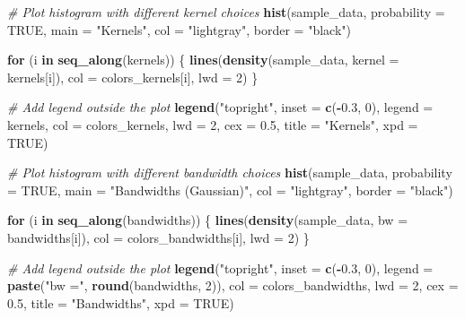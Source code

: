 \documentclass[
]{article}
\newenvironment{Shaded}{\begin{snugshade}}{\end{snugshade}}
\newcommand{\AttributeTok}[1]{\textcolor[rgb]{0.13,0.29,0.53}{#1}}
\newcommand{\CommentTok}[1]{\textcolor[rgb]{0.56,0.35,0.01}{\textit{#1}}}
\newcommand{\ConstantTok}[1]{\textcolor[rgb]{0.56,0.35,0.01}{#1}}
\newcommand{\ControlFlowTok}[1]{\textcolor[rgb]{0.13,0.29,0.53}{\textbf{#1}}}
\newcommand{\DecValTok}[1]{\textcolor[rgb]{0.00,0.00,0.81}{#1}}
\newcommand{\FloatTok}[1]{\textcolor[rgb]{0.00,0.00,0.81}{#1}}
\newcommand{\FunctionTok}[1]{\textcolor[rgb]{0.13,0.29,0.53}{\textbf{#1}}}
\newcommand{\NormalTok}[1]{#1}
\newcommand{\SpecialCharTok}[1]{\textcolor[rgb]{0.81,0.36,0.00}{\textbf{#1}}}
\newcommand{\StringTok}[1]{\textcolor[rgb]{0.31,0.60,0.02}{#1}}
\begin{document}
\begin{Shaded}
\begin{Highlighting}[]
\CommentTok{\# Plot histogram with different kernel choices}
\FunctionTok{hist}\NormalTok{(sample\_data, }\AttributeTok{probability =} \ConstantTok{TRUE}\NormalTok{, }\AttributeTok{main =} \StringTok{"Kernels"}\NormalTok{, }\AttributeTok{col =} \StringTok{"lightgray"}\NormalTok{, }\AttributeTok{border =} \StringTok{"black"}\NormalTok{)}

\ControlFlowTok{for}\NormalTok{ (i }\ControlFlowTok{in} \FunctionTok{seq\_along}\NormalTok{(kernels)) \{}
  \FunctionTok{lines}\NormalTok{(}\FunctionTok{density}\NormalTok{(sample\_data, }\AttributeTok{kernel =}\NormalTok{ kernels[i]), }\AttributeTok{col =}\NormalTok{ colors\_kernels[i], }\AttributeTok{lwd =} \DecValTok{2}\NormalTok{)}
\NormalTok{\}}

\CommentTok{\# Add legend outside the plot}
\FunctionTok{legend}\NormalTok{(}\StringTok{"topright"}\NormalTok{, }\AttributeTok{inset =} \FunctionTok{c}\NormalTok{(}\SpecialCharTok{{-}}\FloatTok{0.3}\NormalTok{, }\DecValTok{0}\NormalTok{), }\AttributeTok{legend =}\NormalTok{ kernels, }\AttributeTok{col =}\NormalTok{ colors\_kernels, }\AttributeTok{lwd =} \DecValTok{2}\NormalTok{, }\AttributeTok{cex =} \FloatTok{0.5}\NormalTok{, }\AttributeTok{title =} \StringTok{"Kernels"}\NormalTok{, }\AttributeTok{xpd =} \ConstantTok{TRUE}\NormalTok{)}

\CommentTok{\# Plot histogram with different bandwidth choices}
\FunctionTok{hist}\NormalTok{(sample\_data, }\AttributeTok{probability =} \ConstantTok{TRUE}\NormalTok{, }\AttributeTok{main =} \StringTok{"Bandwidths (Gaussian)"}\NormalTok{, }\AttributeTok{col =} \StringTok{"lightgray"}\NormalTok{, }\AttributeTok{border =} \StringTok{"black"}\NormalTok{)}

\ControlFlowTok{for}\NormalTok{ (i }\ControlFlowTok{in} \FunctionTok{seq\_along}\NormalTok{(bandwidths)) \{}
  \FunctionTok{lines}\NormalTok{(}\FunctionTok{density}\NormalTok{(sample\_data, }\AttributeTok{bw =}\NormalTok{ bandwidths[i]), }\AttributeTok{col =}\NormalTok{ colors\_bandwidths[i], }\AttributeTok{lwd =} \DecValTok{2}\NormalTok{)}
\NormalTok{\}}

\CommentTok{\# Add legend outside the plot}
\FunctionTok{legend}\NormalTok{(}\StringTok{"topright"}\NormalTok{, }\AttributeTok{inset =} \FunctionTok{c}\NormalTok{(}\SpecialCharTok{{-}}\FloatTok{0.3}\NormalTok{, }\DecValTok{0}\NormalTok{), }\AttributeTok{legend =} \FunctionTok{paste}\NormalTok{(}\StringTok{"bw ="}\NormalTok{, }\FunctionTok{round}\NormalTok{(bandwidths, }\DecValTok{2}\NormalTok{)), }\AttributeTok{col =}\NormalTok{ colors\_bandwidths, }\AttributeTok{lwd =} \DecValTok{2}\NormalTok{, }\AttributeTok{cex =} \FloatTok{0.5}\NormalTok{,}
       \AttributeTok{title =} \StringTok{"Bandwidths"}\NormalTok{, }\AttributeTok{xpd =} \ConstantTok{TRUE}\NormalTok{)}


\end{Highlighting}
\end{Shaded}
\end{document}

